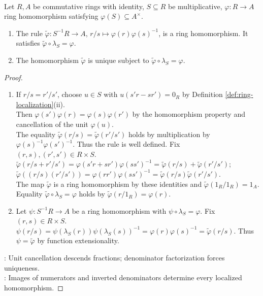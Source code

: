 \begin{theorem} \label{thm:ring-localization-universal-property}
\\
Let $R,A$ be commutative rings with identity, $S\subseteq R$ be multiplicative, $\varphi:R\to A$ ring homomorphism satisfying $\varphi(S)\subseteq A^\times$.
\begin{enumerate}[label=(\roman*)]
\setlength{\itemsep}{0pt}
\item The rule $\widetilde{\varphi}:S^{-1}R\to A$, $r/s\mapsto\varphi(r)\varphi(s)^{-1}$, is a ring homomorphism. It satisfies $\widetilde{\varphi}\circ\lambda_S=\varphi$.
\item The homomorphism $\widetilde{\varphi}$ is unique subject to $\widetilde{\varphi}\circ\lambda_S=\varphi$.
\end{enumerate}
\begin{proof}
\begin{enumerate}[label=(\roman*)]
\setlength{\itemsep}{0pt}
\item If $r/s=r'/s'$, choose $u\in S$ with $u(s'r-sr')=0_R$ by Definition \ref{def:ring-localization}(ii).\\
Then $\varphi(s')\varphi(r)=\varphi(s)\varphi(r')$ by the homomorphism property and cancellation of the unit $\varphi(u)$.\\
The equality $\widetilde{\varphi}(r/s)=\widetilde{\varphi}(r'/s')$ holds by multiplication by $\varphi(s)^{-1}\varphi(s')^{-1}$. Thus the rule is well defined. Fix $(r,s),(r',s')\in R\times S$.\\
$\widetilde{\varphi}(r/s+r'/s')=\varphi(s'r+sr')\varphi(ss')^{-1}=\widetilde{\varphi}(r/s)+\widetilde{\varphi}(r'/s')$; $\widetilde{\varphi}((r/s)(r'/s'))=\varphi(rr')\varphi(ss')^{-1}=\widetilde{\varphi}(r/s)\widetilde{\varphi}(r'/s')$.\\
The map $\widetilde{\varphi}$ is a ring homomorphism by these identities and $\widetilde{\varphi}(1_R/1_R)=1_A$. Equality $\widetilde{\varphi}\circ\lambda_S=\varphi$ holds by $\widetilde{\varphi}(r/1_R)=\varphi(r)$.
\item Let $\psi:S^{-1}R\to A$ be a ring homomorphism with $\psi\circ\lambda_S=\varphi$. Fix $(r,s)\in R\times S$.\\
$\psi(r/s)=\psi(\lambda_S(r))\psi(\lambda_S(s))^{-1}=\varphi(r)\varphi(s)^{-1}=\widetilde{\varphi}(r/s)$. Thus $\psi=\widetilde{\varphi}$ by function extensionality.
\end{enumerate}
: Unit cancellation descends fractions; denominator factorization forces uniqueness.\\
: Images of numerators and inverted denominators determine every localized homomorphism.
\end{proof}
\end{theorem}

